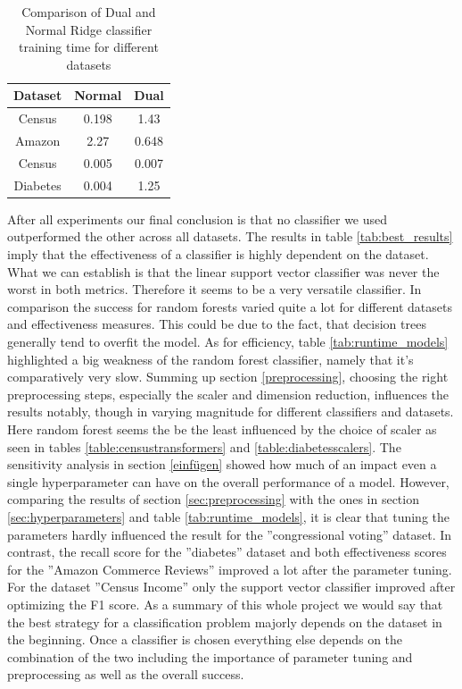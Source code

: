 \documentclass[a4paper,12pt]{article}
\begin{document}
\begin{table}[h!]
\centering
\begin{tabular}{|c|c|c|}
\hline
\textbf{Dataset} & \textbf{Normal} & \textbf{Dual} \\
\hline
Census & 0.198 & 1.43 \\
\hline
Amazon & 2.27 & 0.648 \\
\hline
Census & 0.005 & 0.007 \\
\hline
Diabetes & 0.004 & 1.25 \\
\hline
\end{tabular}
\vspace{0.3cm}
\caption{Comparison of Dual and Normal Ridge classifier training time for different datasets}
\label{tab:dual_comparison}
\end{table}
After all experiments our final conclusion is that no classifier we used outperformed the other across all
datasets. The results in table \ref{tab:best_results} imply that the effectiveness of a classifier is highly dependent on the
dataset. What we can establish is that the linear support vector classifier was never the worst in both
metrics. Therefore it seems to be a very versatile classifier. In comparison the success for random forests
varied quite a lot for different datasets and effectiveness measures. This could be due to the fact, that
decision trees generally tend to overfit the model. As for efficiency, table \ref{tab:runtime_models} highlighted a big weakness of
the random forest classifier, namely that it’s comparatively very slow. Summing up section \ref{preprocessing}, choosing
the right preprocessing steps, especially the scaler and dimension reduction, influences the results notably,
though in varying magnitude for different classifiers and datasets. Here random forest seems the be the
least influenced by the choice of scaler as seen in tables \ref{table:censustransformers} and \ref{table:diabetesscalers}. The sensitivity analysis in section \ref{einfügen}
showed how much of an impact even a single hyperparameter can have on the overall performance of a
model. However, comparing the results of section \ref{sec:preprocessing} with the ones in section \ref{sec:hyperparameters} and table \ref{tab:runtime_models}, it is clear that
tuning the parameters hardly influenced the result for the ”congressional voting” dataset. In contrast, the
recall score for the ”diabetes” dataset and both effectiveness scores for the ”Amazon Commerce Reviews”
improved a lot after the parameter tuning. For the dataset ”Census Income” only the support vector
classifier improved after optimizing the F1 score. As a summary of this whole project we would say that
the best strategy for a classification problem majorly depends on the dataset in the beginning. Once a
classifier is chosen everything else depends on the combination of the two including the importance of
parameter tuning and preprocessing as well as the overall success.
\end{document}
